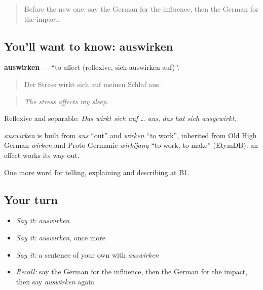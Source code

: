 \begin{quote}
Before the new one: say the German for the influence, then the German for the impact.
\end{quote}

\subsection*{You'll want to know: auswirken}
\textbf{auswirken} — \textquotedblleft{}to affect (reflexive, sich auswirken auf)\textquotedblright{}.

\begin{quote}
Der Stress wirkt sich auf meinen Schlaf aus.
\end{quote}

\begin{quote}
\emph{The stress affects my sleep.}
\end{quote}

Reflexive and separable: \emph{Das wirkt sich auf … aus}, \emph{das hat sich ausgewirkt}.

\begin{cousinweb}
\emph{auswirken} is built from \emph{aus} \textquotedblleft{}out\textquotedblright{} and \emph{wirken} \textquotedblleft{}to work\textquotedblright{}, inherited from Old High German \emph{wirken} and Proto-Germanic \emph{wirkijaną} \textquotedblleft{}to work, to make\textquotedblright{} (EtymDB): an effect works its way out.
\end{cousinweb}

\begin{grammarlens}[title={What you've built}]
One more word for telling, explaining and describing at B1.
\end{grammarlens}

\subsection*{Your turn}
\begin{itemize}
\raggedright
  \item \emph{Say it:} \emph{auswirken}
  \item \emph{Say it:} \emph{auswirken}, once more
  \item \emph{Say it:} a sentence of your own with \emph{auswirken}
  \item \emph{Recall:} say the German for the influence, then the German for the impact, then say \emph{auswirken} again
\end{itemize}


